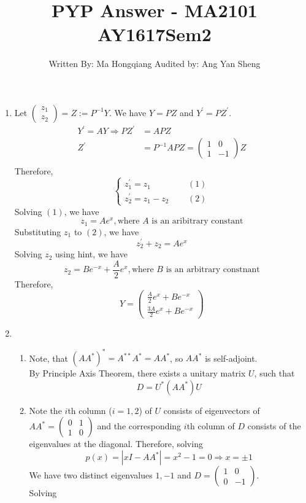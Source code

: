 \documentclass[12pt]{article}
\newcommand{\inv}{^{-1}}
\newcommand{\str}{^\ast}
\theoremstyle{definition}
\begin{document}
\title{PYP Answer - MA2101 AY1617Sem2}
\author{Written By: Ma Hongqiang  Audited by: Ang Yan Sheng}
\maketitle
\begin{enumerate}
  \item Let $\begin{pmatrix}z_1\\z_2\end{pmatrix}=Z:=P^{-1}Y$. We have $Y=PZ$ and $Y^\prime = PZ^\prime$.
  \begin{align*}
  Y^\prime = AY\Rightarrow PZ^\prime &= APZ\\
  Z^\prime &=P\inv APZ=\begin{pmatrix}1&0\\1&-1\end{pmatrix}Z\\
  \end{align*}
  Therefore, 
  \[
  \begin{cases}
  z_1^\prime = z_1&\;\;\;\;\;(1)\\
  z_2^\prime = z_1-z_2&\;\;\;\;\;(2)
  \end{cases}
  \]
  Solving $(1)$, we have
  \[
z_1=Ae^x, \text{where }A \text{ is an aribitrary constant}
  \]
Substituting $z_1$ to $(2)$, we have
\[
z^\prime_2+z_2=Ae^x
\]
Solving $z_2$ using hint, we have
\[
z_2=Be^{-x}+\frac{A}{2}e^x, \text{where }B\text{ is an arbitrary constnant}
\]
Therefore, 
\[
Y=\begin{pmatrix}\frac{A}{2}e^x+Be^{-x}\\\frac{3A}{2}e^x+Be^{-x}\end{pmatrix}
\]
\item \begin{enumerate}
\item Note, that $(AA\str)\str=A^{\ast\ast}A\str = AA\str$, so $AA\str$ is self-adjoint. \\By Principle Axis Theorem, there exists a unitary matrix $U$, such that
\[
D=U\str(AA\str)U
\] 
\item Note the $i$th column ($i=1,2$) of $U$ consists of eigenvectors of $AA\str=\begin{pmatrix}0&1\\1&0\end{pmatrix}$ and the corresponding $i$th column of $D$ consists of the eigenvalues at the diagonal. Therefore, solving
\[
p(x)=|xI-AA\str|=x^2-1=0\Rightarrow x=\pm 1
\]
We have two distinct eigenvalues $1, -1$ and $D=\begin{pmatrix}1&0\\0&-1\end{pmatrix}$.\\Solving

\end{enumerate}
\end{enumerate}
\end{document}
